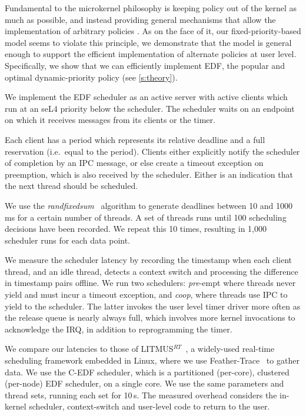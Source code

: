 Fundamental to the microkernel philosophy is keeping policy out of the
kernel as much as possible, and instead providing general mechanisms
that allow the implementation of arbitrary policies
\citep{Heiser_Elphinstone_16}.  As on the face of it, our
fixed-priority-based model seems to violate this principle,  we
demonstrate that the model is general enough to support the efficient
implementation of alternate policies at user level. Specifically, we
show that we can efficiently implement \gls{EDF}, the popular and  optimal dynamic-priority policy (see \autoref{s:theory}).

We implement the EDF scheduler as an active server with active
clients which run at an seL4 priority below the scheduler.
The scheduler waits on an endpoint on which it receives messages from
its clients or the timer.

Each client has a period which represents its relative deadline and a full reservation (i.e.\ equal to the period). Clients
either explicitly notify the scheduler of completion by an IPC
message, or else create a timeout exception on preemption, which is also received by the
scheduler. Either is an indication that the next thread should be scheduled.

We use the \emph{randfixedsum}~\citep{Emberson_SD_10} algorithm to
generate deadlines between 10 and 1000\,ms for a certain number of threads.
A set of threads runs until 100
scheduling decisions have been recorded. We repeat this 10 times,
resulting in 1,000 scheduler runs for each data point.

We measure the scheduler latency by recording the timestamp when each client thread, and an idle
thread, detects a
context switch and processing the difference in timestamp pairs offline. We run two schedulers:
\emph{pre}-empt where threads never yield and must incur a timeout exception, and \emph{coop}, where
threads use IPC to yield to the scheduler. The latter invokes the user level timer
driver more often as the release queue is nearly always full, which involves more kernel invocations
to acknowledge the IRQ, in addition to reprogramming the timer.

We compare our latencies to those of
LITMUS$^{RT}$~\citep{Calandrino_LBDA_07}, a widely-used real-time scheduling
framework embedded in Linux, where we use Feather-Trace~\citep{Brandenburg_Anderson_07} to gather data.
We use the C-EDF scheduler, which is a partitioned (per-core), clustered (per-node) EDF scheduler, on a single
core. We use the same parameters and thread sets, running each set for 10\,s. 
The measured overhead considers the in-kernel scheduler, context-switch and user-level code to return to
the user.


